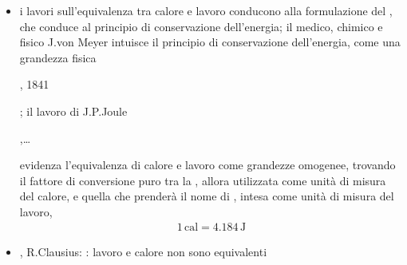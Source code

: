 \documentclass[letterpaper,10pt,italian]{jupyterBook}
\begin{document}
\begin{itemize}
\item {} 
\sphinxAtStartPar
i lavori sull’equivalenza tra calore e lavoro conducono alla formulazione del , che conduce al principio di conservazione dell’energia; il medico, chimico e fisico J.von Meyer intuisce il principio di conservazione dell’energia, come una grandezza fisica %
\begin{footnote}[2]\sphinxAtStartFootnote
{}, 1841
%
\end{footnote}; il lavoro di J.P.Joule%
\begin{footnote}[3]\sphinxAtStartFootnote
{},…
%
\end{footnote} evidenza l’equivalenza di calore e lavoro come grandezze omogenee, trovando il fattore di conversione puro tra la , allora utilizzata come unità di misura del calore, e quella che prenderà il nome di , intesa come unità di misura del lavoro,
\begin{equation*}
\begin{split}1 \, \text{cal} = 4.184 \, \text{J}\end{split}
\end{equation*}
\item {} 
, R.Clausius: : lavoro e calore non sono equivalenti 

\end{itemize}
\label{ch/thermodynamics/foundation-experiments:example-9}
\end{document}
